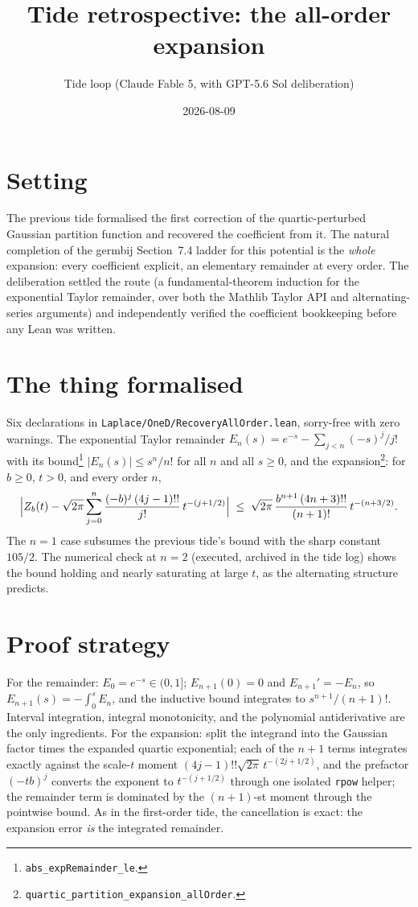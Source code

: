 \documentclass[11pt]{article}
\title{Tide retrospective: the all-order expansion}
\author{Tide loop (Claude Fable 5, with GPT-5.6 Sol deliberation)}
\date{2026-08-09}
\begin{document}
\maketitle

\section{Setting}

The previous tide formalised the first correction of the
quartic-perturbed Gaussian partition function and recovered the
coefficient from it. The natural completion of the germbij Section~7.4
ladder for this potential is the \emph{whole} expansion: every
coefficient explicit, an elementary remainder at every order. The
deliberation settled the route (a fundamental-theorem induction for the
exponential Taylor remainder, over both the Mathlib Taylor API and
alternating-series arguments) and independently verified the coefficient
bookkeeping before any Lean was written.

\section{The thing formalised}

Six declarations in \texttt{Laplace/OneD/RecoveryAllOrder.lean},
sorry-free with zero warnings. The exponential Taylor remainder
$E_n(s) = e^{-s} - \sum_{j<n} (-s)^j/j!$ with its
bound\footnote{\texttt{abs\_expRemainder\_le}.}
$|E_n(s)| \leq s^n/n!$ for all $n$ and all $s \geq 0$, and the
expansion\footnote{\texttt{quartic\_partition\_expansion\_allOrder}.}:
for $b \geq 0$, $t > 0$, and every order $n$,
\[
\Bigl| Z_b(t) - \sqrt{2\pi}\sum_{j=0}^{n}
\frac{(-b)^j\,(4j-1)!!}{j!}\, t^{-(j+1/2)} \Bigr|
\;\leq\;
\sqrt{2\pi}\,\frac{b^{n+1}\,(4n+3)!!}{(n+1)!}\, t^{-(n+3/2)} .
\]
The $n = 1$ case subsumes the previous tide's bound with the sharp
constant $105/2$. The numerical check at $n = 2$ (executed, archived in
the tide log) shows the bound holding and nearly saturating at large
$t$, as the alternating structure predicts.

\section{Proof strategy}

For the remainder: $E_0 = e^{-s} \in (0, 1]$; $E_{n+1}(0) = 0$ and
$E_{n+1}' = -E_n$, so $E_{n+1}(s) = -\int_0^s E_n$, and the inductive
bound integrates to $s^{n+1}/(n+1)!$. Interval integration, integral
monotonicity, and the polynomial antiderivative are the only
ingredients. For the expansion: split the integrand into the Gaussian
factor times the expanded quartic exponential; each of the $n+1$ terms
integrates exactly against the scale-$t$ moment
$(4j-1)!!\sqrt{2\pi}\,t^{-(2j+1/2)}$, and the prefactor $(-tb)^j$
converts the exponent to $t^{-(j+1/2)}$ through one isolated
\texttt{rpow} helper; the remainder term is dominated by the
$(n+1)$-st moment through the pointwise bound. As in the first-order
tide, the cancellation is exact: the expansion error \emph{is} the
integrated remainder.
\end{document}
